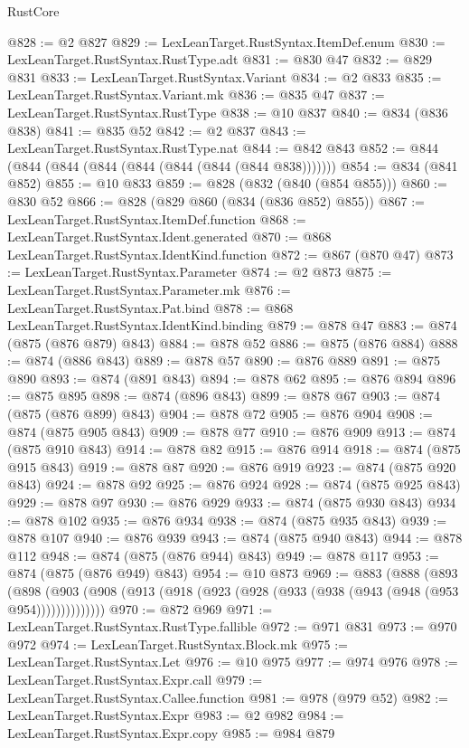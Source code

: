 \begin{lexlean}{RustCore}
\begin{coremodule}
@828 := @2 @827
@829 := LexLeanTarget.RustSyntax.ItemDef.enum
@830 := LexLeanTarget.RustSyntax.RustType.adt
@831 := @830 @47
@832 := @829 @831
@833 := LexLeanTarget.RustSyntax.Variant
@834 := @2 @833
@835 := LexLeanTarget.RustSyntax.Variant.mk
@836 := @835 @47
@837 := LexLeanTarget.RustSyntax.RustType
@838 := @10 @837
@840 := @834 (@836 @838)
@841 := @835 @52
@842 := @2 @837
@843 := LexLeanTarget.RustSyntax.RustType.nat
@844 := @842 @843
@852 := @844 (@844 (@844 (@844 (@844 (@844 (@844 (@844 @838)))))))
@854 := @834 (@841 @852)
@855 := @10 @833
@859 := @828 (@832 (@840 (@854 @855)))
@860 := @830 @52
@866 := @828 (@829 @860 (@834 (@836 @852) @855))
@867 := LexLeanTarget.RustSyntax.ItemDef.function
@868 := LexLeanTarget.RustSyntax.Ident.generated
@870 := @868 LexLeanTarget.RustSyntax.IdentKind.function
@872 := @867 (@870 @47)
@873 := LexLeanTarget.RustSyntax.Parameter
@874 := @2 @873
@875 := LexLeanTarget.RustSyntax.Parameter.mk
@876 := LexLeanTarget.RustSyntax.Pat.bind
@878 := @868 LexLeanTarget.RustSyntax.IdentKind.binding
@879 := @878 @47
@883 := @874 (@875 (@876 @879) @843)
@884 := @878 @52
@886 := @875 (@876 @884)
@888 := @874 (@886 @843)
@889 := @878 @57
@890 := @876 @889
@891 := @875 @890
@893 := @874 (@891 @843)
@894 := @878 @62
@895 := @876 @894
@896 := @875 @895
@898 := @874 (@896 @843)
@899 := @878 @67
@903 := @874 (@875 (@876 @899) @843)
@904 := @878 @72
@905 := @876 @904
@908 := @874 (@875 @905 @843)
@909 := @878 @77
@910 := @876 @909
@913 := @874 (@875 @910 @843)
@914 := @878 @82
@915 := @876 @914
@918 := @874 (@875 @915 @843)
@919 := @878 @87
@920 := @876 @919
@923 := @874 (@875 @920 @843)
@924 := @878 @92
@925 := @876 @924
@928 := @874 (@875 @925 @843)
@929 := @878 @97
@930 := @876 @929
@933 := @874 (@875 @930 @843)
@934 := @878 @102
@935 := @876 @934
@938 := @874 (@875 @935 @843)
@939 := @878 @107
@940 := @876 @939
@943 := @874 (@875 @940 @843)
@944 := @878 @112
@948 := @874 (@875 (@876 @944) @843)
@949 := @878 @117
@953 := @874 (@875 (@876 @949) @843)
@954 := @10 @873
@969 := @883
    (@888
      (@893
        (@898 (@903 (@908 (@913 (@918 (@923 (@928 (@933 (@938 (@943 (@948 (@953 @954))))))))))))))
@970 := @872 @969
@971 := LexLeanTarget.RustSyntax.RustType.fallible
@972 := @971 @831
@973 := @970 @972
@974 := LexLeanTarget.RustSyntax.Block.mk
@975 := LexLeanTarget.RustSyntax.Let
@976 := @10 @975
@977 := @974 @976
@978 := LexLeanTarget.RustSyntax.Expr.call
@979 := LexLeanTarget.RustSyntax.Callee.function
@981 := @978 (@979 @52)
@982 := LexLeanTarget.RustSyntax.Expr
@983 := @2 @982
@984 := LexLeanTarget.RustSyntax.Expr.copy
@985 := @984 @879

\end{coremodule}
\end{lexlean}
